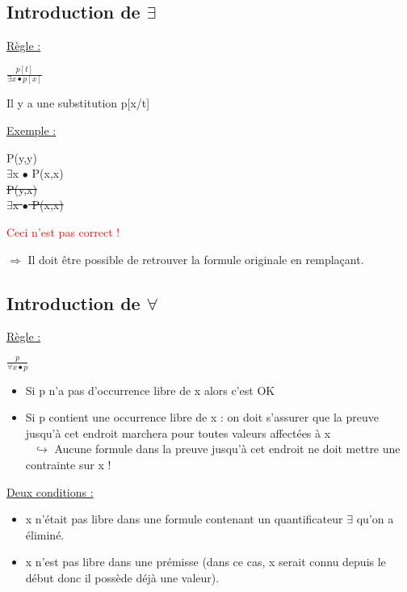\begin{flushleft}
\subsection{Introduction de $\exists$}
\underline{R\`egle :}\\
\begin{center}
{\LARGE $\frac{p[t]}{\exists x \bullet p[x]}$}
\end{center}
\begin{flushright}
Il y a une substitution p[x/t]
\end{flushright}

\underline{Exemple :}\\
\begin{center}
 P(y,y)\\
$\exists$x $\bullet$ P(x,x)\\[2\baselineskip]
\sout{P(y,x)}\\
\sout{$\exists$x $\bullet$ P(x,x)}
\begin{flushright}
\textcolor{red}{Ceci n'est pas correct !}
\end{flushright}
\end{center}
$\Rightarrow$ Il doit être possible de retrouver la formule originale en remplaçant.\\

\subsection{Introduction de $\forall$}
\underline{R\`egle :}\\
\begin{center}
{\LARGE $\frac{p}{\forall x \bullet p}$}
\end{center}
\begin{itemize}
\item Si p n'a pas d'occurrence libre de x alors c'est OK
\item Si p contient une occurrence libre de x : on doit s'assurer que la preuve jusqu'à cet endroit marchera pour toutes valeurs affectées à x\\
$\> \> \> \hookrightarrow$ Aucune formule dans la preuve jusqu'à cet endroit ne doit mettre une contrainte sur x !
\end{itemize}
\underline{Deux conditions :}\\
\begin{itemize}
\item x n'était pas libre dans une formule contenant un quantificateur $\exists$ qu'on a éliminé.
\item x n'est pas libre dans une prémisse (dans ce cas, x serait connu depuis le début donc il possède déjà une valeur).
\end{itemize}


\end{flushleft}
